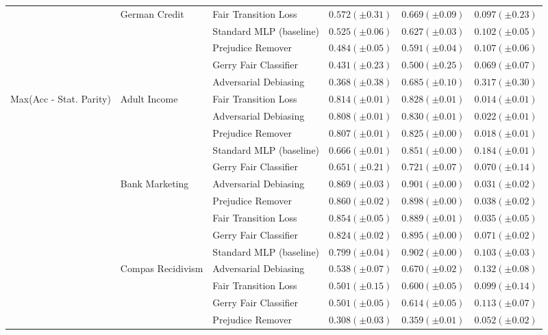 \begin{tabular}{llllll}
\cline{2-6}
 & \multirow[t]{5}{*}{German Credit} & Fair Transition Loss & $0.572 (\pm0.31)$ & $0.669 (\pm0.09)$ & $0.097 (\pm0.23)$ \\
 &  & Standard MLP (baseline) & $0.525 (\pm0.06)$ & $0.627 (\pm0.03)$ & $0.102 (\pm0.05)$ \\
 &  & Prejudice Remover & $0.484 (\pm0.05)$ & $0.591 (\pm0.04)$ & $0.107 (\pm0.06)$ \\
 &  & Gerry Fair Classifier & $0.431 (\pm0.23)$ & $0.500 (\pm0.25)$ & $0.069 (\pm0.07)$ \\
 &  & Adversarial Debiasing & $0.368 (\pm0.38)$ & $0.685 (\pm0.10)$ & $0.317 (\pm0.30)$ \\
\cline{1-6} \cline{2-6}
\multirow[t]{20}{*}{Max(Acc - Stat. Parity)} & \multirow[t]{5}{*}{Adult Income} & Fair Transition Loss & $0.814 (\pm0.01)$ & $0.828 (\pm0.01)$ & $0.014 (\pm0.01)$ \\
 &  & Adversarial Debiasing & $0.808 (\pm0.01)$ & $0.830 (\pm0.01)$ & $0.022 (\pm0.01)$ \\
 &  & Prejudice Remover & $0.807 (\pm0.01)$ & $0.825 (\pm0.00)$ & $0.018 (\pm0.01)$ \\
 &  & Standard MLP (baseline) & $0.666 (\pm0.01)$ & $0.851 (\pm0.00)$ & $0.184 (\pm0.01)$ \\
 &  & Gerry Fair Classifier & $0.651 (\pm0.21)$ & $0.721 (\pm0.07)$ & $0.070 (\pm0.14)$ \\
\cline{2-6}
 & \multirow[t]{5}{*}{Bank Marketing} & Adversarial Debiasing & $0.869 (\pm0.03)$ & $0.901 (\pm0.00)$ & $0.031 (\pm0.02)$ \\
 &  & Prejudice Remover & $0.860 (\pm0.02)$ & $0.898 (\pm0.00)$ & $0.038 (\pm0.02)$ \\
 &  & Fair Transition Loss & $0.854 (\pm0.05)$ & $0.889 (\pm0.01)$ & $0.035 (\pm0.05)$ \\
 &  & Gerry Fair Classifier & $0.824 (\pm0.02)$ & $0.895 (\pm0.00)$ & $0.071 (\pm0.02)$ \\
 &  & Standard MLP (baseline) & $0.799 (\pm0.04)$ & $0.902 (\pm0.00)$ & $0.103 (\pm0.03)$ \\
\cline{2-6}
 & \multirow[t]{5}{*}{Compas Recidivism} & Adversarial Debiasing & $0.538 (\pm0.07)$ & $0.670 (\pm0.02)$ & $0.132 (\pm0.08)$ \\
 &  & Fair Transition Loss & $0.501 (\pm0.15)$ & $0.600 (\pm0.05)$ & $0.099 (\pm0.14)$ \\
 &  & Gerry Fair Classifier & $0.501 (\pm0.05)$ & $0.614 (\pm0.05)$ & $0.113 (\pm0.07)$ \\
 &  & Prejudice Remover & $0.308 (\pm0.03)$ & $0.359 (\pm0.01)$ & $0.052 (\pm0.02)$ \\

\end{tabular}
